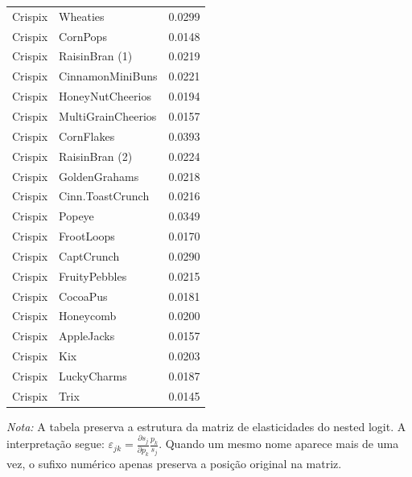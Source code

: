 \begin{table}[H]
\begin{tabular}{llr}
Crispix & Wheaties & 0.0299 \\
Crispix & CornPops & 0.0148 \\
Crispix & RaisinBran (1) & 0.0219 \\
Crispix & CinnamonMiniBuns & 0.0221 \\
Crispix & HoneyNutCheerios & 0.0194 \\
Crispix & MultiGrainCheerios & 0.0157 \\
Crispix & CornFlakes & 0.0393 \\
Crispix & RaisinBran (2) & 0.0224 \\
Crispix & GoldenGrahams & 0.0218 \\
Crispix & Cinn.ToastCrunch & 0.0216 \\
Crispix & Popeye & 0.0349 \\
Crispix & FrootLoops & 0.0170 \\
Crispix & CaptCrunch & 0.0290 \\
Crispix & FruityPebbles & 0.0215 \\
Crispix & CocoaPus & 0.0181 \\
Crispix & Honeycomb & 0.0200 \\
Crispix & AppleJacks & 0.0157 \\
Crispix & Kix & 0.0203 \\
Crispix & LuckyCharms & 0.0187 \\
Crispix & Trix & 0.0145 \\
\bottomrule
\end{tabular}

\vspace{0.3em}
\footnotesize
\textit{Nota:} A tabela preserva a estrutura da matriz de elasticidades do nested logit. A interpretação segue: $\varepsilon_{jk}=\frac{\partial s_j}{\partial p_k}\frac{p_k}{s_j}$. Quando um mesmo nome aparece mais de uma vez, o sufixo numérico apenas preserva a posição original na matriz.
\end{table}
\endgroup


